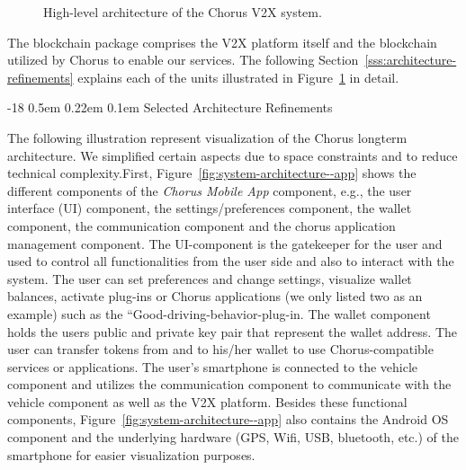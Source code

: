 \documentclass{llncs}
\makeatletter
\renewcommand\subsubsection{\@startsection{subsubsection}{3}{\z@}%
		{-18\p@ \@plus -4\p@ \@minus -4\p@}%
		{0.5em \@plus 0.22em \@minus 0.1em}%
		{\normalfont\normalsize\bfseries\boldmath}}
\makeatother
\begin{document}
{\begin{figure}[H]
					\caption{High-level architecture of the Chorus V2X system.}	
					\label{fig:high-level-architecture}
				\end{figure}					
				The blockchain package comprises the V2X platform itself and the blockchain utilized by Chorus to enable our services. The following Section~\ref{sss:architecture-refinements} explains each of the units illustrated in Figure~\ref{fig:high-level-architecture} in detail.
			
			

			\subsubsection{Selected Architecture Refinements}
				\label{sss:architecture-refinements}
			
				The following illustration represent visualization of the Chorus longterm architecture. We simplified certain aspects due to space constraints and to reduce technical complexity.First, Figure~\ref{fig:system-architecture--app} shows the different components of the \textit{Chorus Mobile App} component, e.g., the user interface (UI) component, the settings/preferences component, the wallet component, the communication component and the chorus application management component. The UI-component is the gatekeeper for the user and used to control all functionalities from the user side and also to interact with the system. The user can set preferences and change settings, visualize wallet balances, activate plug-ins or Chorus applications (we only listed two as an example) such as the ``Good-driving-behavior-plug-in. The wallet component holds the users public and private key pair that represent the wallet address. The user can transfer tokens from and to his/her wallet to use Chorus-compatible services or applications. The user's smartphone is connected to the vehicle component and utilizes the communication component to communicate with the vehicle component as well as the V2X platform. Besides these functional components, Figure~\ref{fig:system-architecture--app} also contains the Android OS component and the underlying hardware (GPS, Wifi, USB, bluetooth, etc.) of the smartphone for easier visualization purposes.

}
\end{document}
